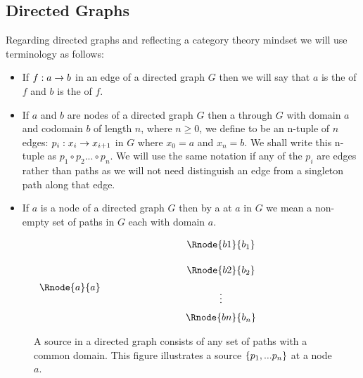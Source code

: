 \subsection{Directed Graphs}
Regarding directed graphs and reflecting a category theory mindset we will use terminology as follows:
\begin{itemize}
\item
 If $f: a \rightarrow b$ in an edge of a directed graph $G$ then we will say that $a$ is the  of $f$ and $b$ is the  of $f$.
\item
If $a$ and $b$ are nodes of a directed graph $G$ then a  through $G$ with domain $a$ and 
codomain $b$ of length $n$, where $n \geq 0$, we define to be  an n-tuple of  $n$ edges: $p_i: x_i \rightarrow x_{i+1} $ in $G$ where $x_0=a$ and $x_n=b$. We shall write this n-tuple as $p_1 \circ p_2... \circ p_n$. 
We will use the same notation if any of the $p_i$ are edges rather than paths as we will not need distinguish  an edge from a singleton path along that edge. 
\item
If $a$ is a node of a directed graph $G$ then by a  at $a$ in $G$ we mean a non-empty set of paths in $G$ each with domain $a$.
\end{itemize}
\begin{figure}
\setlength{\arraycolsep}{.2cm}
\begin{center}
$
\begin{array}{cp{2cm}ccp{2cm}c}
             & &         & \Rnode{b1}{b_1} \\ [0.5cm]
						 & &         & \Rnode{b2}{b_2} \\ [0.2cm]
\Rnode{a}{a} & &         &                 \\ [-0.2cm]						
             & &         &    \vdots       \\ [0.2cm]
             & &         & \Rnode{bn}{b_n} \\ 
\end{array}
$
\end{center}
\caption{A source in a directed graph consists of any set of paths with a common domain. This figure illustrates a source $\left\{p_1,...p_n\right\}$ at a node $a$.}
\label{sourceillustration}
\end{figure}

